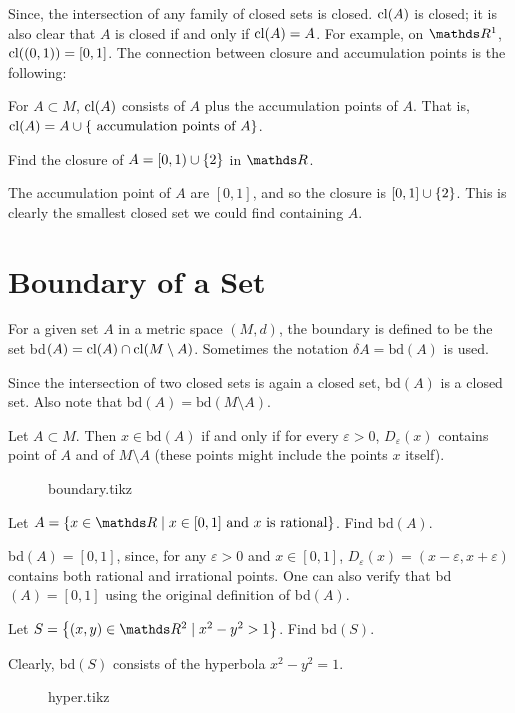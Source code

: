 \documentclass[../main-sheet.tex]{subfiles}
\begin{document}
Since, the intersection of any family of closed sets is closed. $ \operatorname{cl}(A) $ is closed; it is also clear that $ A $ is closed if and only if $ \operatorname{cl}(A)=A $. For example, on $ \R^1 $, $ \operatorname{cl}((0,1))=[0,1] $. The connection between closure and accumulation points is the following:
\begin{thm}
    For $ A\subset M $, $ \operatorname{cl}(A) $ consists of $ A $ plus the accumulation points of $ A $. That is, $ \operatorname{cl}(A)=A\cup \{\text{ accumulation points of } A\} $.
\end{thm} 
\begin{prob}
    Find the closure of $ A=[0,1)\cup \left\{2\right\} $ in $ \R $.
\end{prob}
\begin{soln}
    The accumulation point of $ A $ are $ [0,1] $, and so the closure is $ [0,1]\cup \left\{2\right\} $. This is clearly the smallest closed set we could find containing $ A $.
\end{soln}
\section{Boundary of a Set}
\begin{defn}
    For a given set $ A $ in a metric space $ (M,d) $, the boundary is defined to be the set bd$ (A)=\operatorname{cl}(A)\cap\operatorname{cl}(M\setminus A) $. Sometimes the notation $ \delta A=\text{bd}(A)$ is used.
\end{defn}

Since the intersection of two closed sets is again a closed set,  bd$ (A) $ is a closed set. Also note that $ \text{bd}(A)=\text{bd}(M\setminus A) $.
\begin{prop}
    Let $ A\subset M $. Then $ x\in\text{bd}(A) $ if and only if for every $ \varepsilon >0$, $ D_{\varepsilon}(x) $ contains point of $ A $ and of $ M\setminus A $ (these points might include the points $ x $ itself).
    \begin{figure}[H]
        \centering
        {boundary.tikz}
    \end{figure}
\end{prop}
\begin{prob}
    Let $ A=\set{x\in\R\mid x\in[0,1]\text{ and }x \text{ is rational}} $. Find bd$ (A) $.
\end{prob}
\begin{soln}
    bd$ (A)=[0,1] $, since, for any $ \varepsilon>0 $ and $ x\in [0,1] $, $ D_{\varepsilon}(x)=(x-\varepsilon,x+\varepsilon) $ contains both rational and irrational points. One can also verify that bd$ (A)=[0,1] $ using the original definition of bd$ (A) $.
\end{soln}
\begin{prob}
    Let $ S=\set{(x,y)\in\R^2 \mid x^2-y^2>1} $. Find bd$ (S) $.
\end{prob}
\begin{soln}
    Clearly, bd$ (S) $ consists of the hyperbola $ x^2-y^2=1 $.
    \begin{figure}[H]
        \centering
        {hyper.tikz}
    \end{figure}
\end{soln}
\end{document}

